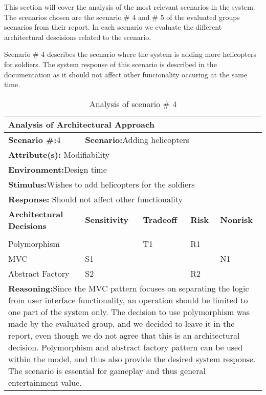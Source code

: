 This section will cover the analysis of the most relevant scenarios in the system. The scenarios chosen are the scenario \# 4 and \# 5 of the evaluated groups scenarios from their report. In each scenario we evaluate the different architectural descisions related to the scenario. 


Scenario \# 4 describes the scenario where the system is adding more helicopters for soldiers. The system response of this scenario is described in the documentation as it should not affect other funcionality occuring at the same time.

\begin{table}[h]
  \begin{tabularx}{400pt}{|l|l|l|l|l|}
    \hline
    \multicolumn{5}{|l|}{\textbf{Analysis of Architectural Approach}}\\
    \hline
    \multicolumn{1}{|l|}{\textbf{Scenario \#:}4} & \multicolumn{4}{|l|}{\textbf{Scenario:}Adding helicopters} \\
    \hline
    \multicolumn{5}{|l|}{\textbf{Attribute(s):} Modifiability} \\
    \hline
    \multicolumn{5}{|l|}{\textbf{Environment:}Design time} \\
    \hline
    \multicolumn{5}{|l|}{\textbf{Stimulus:}Wishes to add helicopters for the soldiers} \\
    \hline
    \multicolumn{5}{|l|}{\textbf{Response:} Should not affect other functionality} \\
    \hline
    \textbf{Architectural Decisions} & \textbf{Sensitivity} & \textbf{Tradeoff} & \textbf{Risk} & \textbf{Nonrisk} \\
    & & & & \\
    \hline 
    Polymorphism & & T1 & R1 &  \\
    \hline
    MVC & S1 & & & N1 \\
    \hline
    Abstract Factory & S2 & & R2 & \\
    \hline
    \multicolumn{5}{|X|}{\textbf{Reasoning:}Since the MVC pattern focuses on separating the logic from user interface functionality, an operation should be limited to one part of the system only. The decision to use polymorphism was made by the evaluated group, and we decided to leave it in the report, even though we do not agree that this is an architectural decision. Polymorphism and abstract factory pattern can be used within the model, and thus also provide the desired system response. The scenario is essential for gameplay and thus general entertainment value.} \\
    \hline
    \hline
  \end{tabularx}
\caption{Analysis of scenario \# 4}
\end{table} 

